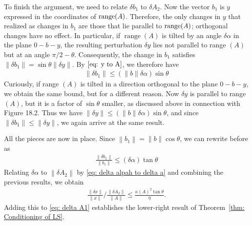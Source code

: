 To finish the argument, we need to relate $\delta b_1$ to $\delta A_2$. Now the vector $b_1$ is $y$ expressed in the coordinates of $\operatorname{range}(A)$.  Therefore, the only changes in $y$ that realized as changes in $b_1$ are those that lie parallel to $\operatorname{range}(A)$; orthogonal changes have no effect. In particular, if $\operatorname{range}(A)$ is tilted by an angle $\delta \alpha$ in the plane $0-b-y$, the resulting perturbation $\delta y$ lies not parallel to range $(A)$ but at an angle $\pi / 2-\theta$. Consequently, the change in $b_1$ satisfies $\left\|\delta b_1\right\|=\sin \theta\|\delta y\|$. By $\eqref{eq: y to A}$, we therefore have
\begin{align*}
\left\|\delta b_1\right\| \leq(\|b\| \delta \alpha) \sin \theta
\end{align*}
Curiously, if range $(A)$ is tilted in a direction orthogonal to the plane $0-b-y$, we obtain the same bound, but for a different reason. Now $\delta y$ is parallel to range $(A)$, but it is a factor of $\sin \theta$ smaller, as discussed above in connection with Figure 18.2. Thus we have $\|\delta y\| \leq(\|b\| \delta \alpha) \sin \theta$, and since $\left\|\delta b_1\right\| \leq\|\delta y\|$, we again arrive at the same result.

All the pieces are now in place. Since $\left\|b_1\right\|=\|b\| \cos \theta$, we can rewrite before as
\begin{align*}
\frac{\left\|\delta b_1\right\|}{\left\|b_1\right\|} \leq(\delta \alpha) \tan \theta
\end{align*}
Relating $\delta \alpha$ to $\left\|\delta A_2\right\|$ by \eqref{eq: delta alpah to delta a} and combining the previous results, we obtain
\begin{align*}
\frac{\|\delta x\|}{\|x\|} / \frac{\left\|\delta A_2\right\|}{\|A\|} \leq \frac{\kappa(A)^2 \tan \theta}{\eta} .
\end{align*}
Adding this to \eqref{eq: delta A1} establishes the lower-right result of Theorem~\ref{thm: Conditioning of LS}.